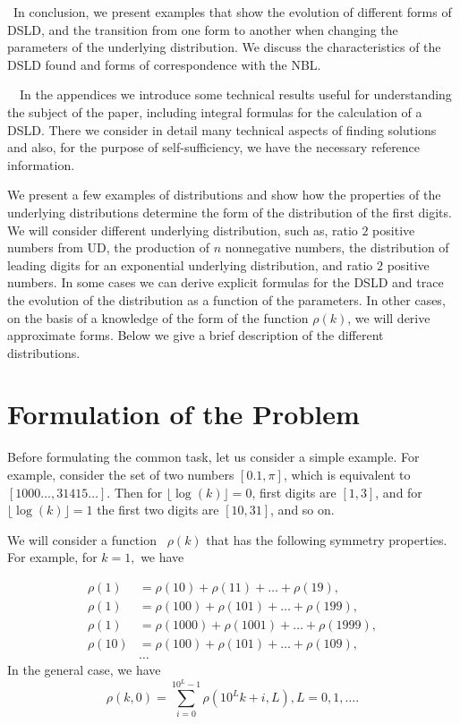 \documentclass[titlepage,fleqn]{article}%
\begin{document}
~In conclusion, we present examples that show the evolution of different forms
of DSLD, and the transition from one form to another when changing the
parameters of the underlying distribution. We discuss the characteristics of
the DSLD found and forms of correspondence with the NBL.

~~In the appendices we introduce some technical results useful for
understanding the subject of the paper, including integral formulas for the
calculation of a DSLD. There we consider in detail many technical aspects of
finding solutions and also, for the purpose of self-sufficiency, we have the
necessary reference information.

We present a few examples of distributions and show how the properties of the
underlying distributions determine the form of the distribution of the first
digits. We will consider different underlying distribution, such as, ratio $2$
positive numbers from UD, the production of $n$ nonnegative numbers, the
distribution of leading digits for an exponential underlying distribution, and
ratio $2$ positive numbers. In some cases we can derive explicit formulas for
the DSLD and trace the evolution of the distribution as a function of the
parameters. In other cases, on the basis of a knowledge of the form of the
function $\rho(k)$, we will derive approximate forms. Below we give a brief
description of the different distributions.

\section{Formulation of the Problem}%

\label{FormulationOf prob}%


Before formulating the common task, let us consider a simple example. For
example, consider the set of two numbers $[0.1,\pi]$, which is equivalent to
$[1000\ldots,31415\ldots]$. Then for $\lfloor\log(k)\rfloor=0$, first digits
are $[1,3]$, and for $\lfloor\log(k)\rfloor=1$ the first two digits are
$[10,31]$, and so on.

We will consider a function \ $\rho(k)$ that has the following symmetry
properties. For example, for $k=1,$ we have%

\begin{align}
\rho(1)  &  =\rho(10)+\rho(11)+\ldots+\rho(19),\label{Cond1}\\
\rho(1)  &  =\rho(100)+\rho(101)+\ldots+\rho(199),\nonumber\\
\rho(1)  &  =\rho(1000)+\rho(1001)+\ldots+\rho(1999),\nonumber\\
\rho(10)  &  =\rho(100)+\rho(101)+\ldots+\rho(109),\nonumber\\
&  \ldots\nonumber
\end{align}
In the general case, we have%
\begin{equation}
\rho(k,0)=%
{\displaystyle\sum\limits_{i=0}^{10^{L}-1}}
\rho(10^{L}k+i,L),L=0,1,\ldots. \label{MainEq_1}%
\end{equation}
%
\end{document}
